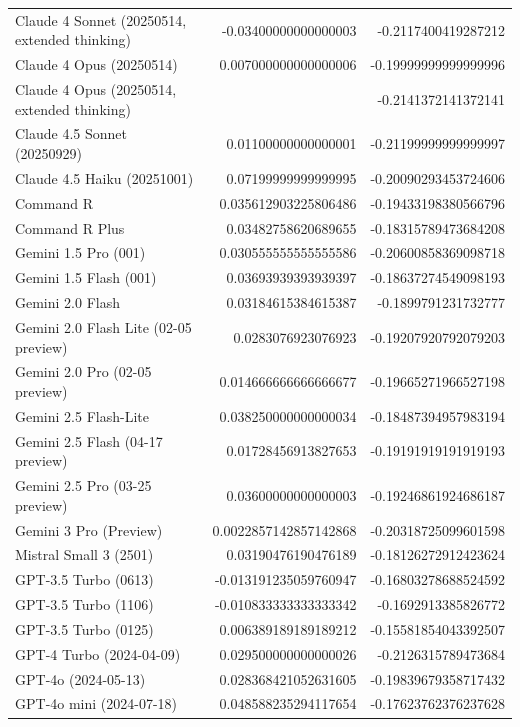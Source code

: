 \begin{table}[htp]
{\begin{tabular}{lrr}
Claude 4 Sonnet (20250514, extended thinking) & -0.03400000000000003 & -0.2117400419287212 \\
Claude 4 Opus (20250514) & 0.007000000000000006 & -0.19999999999999996 \\
Claude 4 Opus (20250514, extended thinking) &  & -0.2141372141372141 \\
Claude 4.5 Sonnet (20250929) & 0.01100000000000001 & -0.21199999999999997 \\
Claude 4.5 Haiku (20251001) & 0.07199999999999995 & -0.20090293453724606 \\
Command R & 0.035612903225806486 & -0.19433198380566796 \\
Command R Plus & 0.03482758620689655 & -0.18315789473684208 \\
Gemini 1.5 Pro (001) & 0.030555555555555586 & -0.20600858369098718 \\
Gemini 1.5 Flash (001) & 0.03693939393939397 & -0.18637274549098193 \\
Gemini 2.0 Flash & 0.03184615384615387 & -0.1899791231732777 \\
Gemini 2.0 Flash Lite (02-05 preview) & 0.0283076923076923 & -0.19207920792079203 \\
Gemini 2.0 Pro (02-05 preview) & 0.014666666666666677 & -0.19665271966527198 \\
Gemini 2.5 Flash-Lite & 0.038250000000000034 & -0.18487394957983194 \\
Gemini 2.5 Flash (04-17 preview) & 0.01728456913827653 & -0.19191919191919193 \\
Gemini 2.5 Pro (03-25 preview) & 0.03600000000000003 & -0.19246861924686187 \\
Gemini 3 Pro (Preview) & 0.0022857142857142868 & -0.20318725099601598 \\
Mistral Small 3 (2501) & 0.03190476190476189 & -0.18126272912423624 \\
GPT-3.5 Turbo (0613) & -0.013191235059760947 & -0.16803278688524592 \\
GPT-3.5 Turbo (1106) & -0.010833333333333342 & -0.1692913385826772 \\
GPT-3.5 Turbo (0125) & 0.006389189189189212 & -0.15581854043392507 \\
GPT-4 Turbo (2024-04-09) & 0.029500000000000026 & -0.2126315789473684 \\
GPT-4o (2024-05-13) & 0.028368421052631605 & -0.19839679358717432 \\
GPT-4o mini (2024-07-18) & 0.048588235294117654 & -0.17623762376237628 \\

\end{tabular}}
\end{table}
